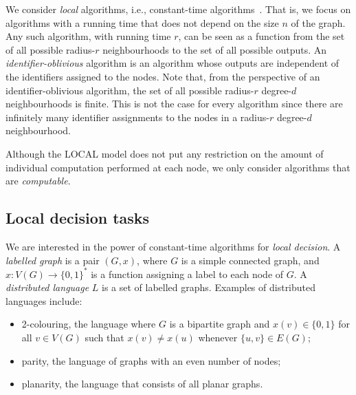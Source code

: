 \documentclass[11pt,a4paper]{article}
\theoremstyle{definition}
\theoremstyle{remark}
\begin{document}
We consider \emph{local} algorithms, i.e., constant-time algorithms~\cite{suomela13survey}. That is, we focus on algorithms with a running time that does not depend on  the size $n$ of the graph. Any such algorithm, with running time $r$, can be seen as a function from the set of all possible radius-$r$ neighbourhoods to the set of all possible outputs. An \emph{identifier-oblivious} algorithm is an algorithm whose outputs are independent of the identifiers assigned to the nodes. Note that, from the perspective of an identifier-oblivious algorithm, the set of all possible radius-$r$ degree-$d$ neighbourhoods is finite. This is not the case for every algorithm since there are infinitely many identifier assignments to the nodes in a radius-$r$  degree-$d$ neighbourhood. 

Although the \textsf{LOCAL} model does not put any restriction on the amount of individual computation performed at each node, we only consider algorithms that are \emph{computable}. 

\subsection{Local decision tasks} 

We are interested in the power of constant-time algorithms for \emph{local decision}. A \emph{labelled graph} is a pair $(G, x)$, where $G$ is a simple connected graph, and $x:V(G)\to\{0,1\}^*$ is a function assigning a label to each node of $G$. A \emph{distributed language} $L$ is a set of labelled graphs.  Examples of distributed languages include:
\begin{itemize}[noitemsep]
    \item 2-colouring, the language where $G$ is a bipartite graph and $x(v) \in \{0,1\}$ for all $v \in V(G)$ such that $x(v) \neq x(u)$ whenever $\{u,v\} \in E(G)$;
    \item parity, the language of graphs with an even number of nodes;
    \item planarity, the language that consists of all planar graphs.
\end{itemize}
\end{document}
